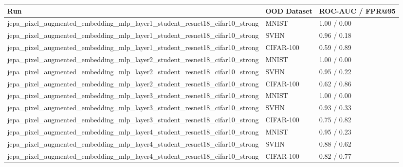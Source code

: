 \begin{tabular}{lll}
\toprule
Run & OOD Dataset & ROC-AUC / FPR@95 \\
\midrule
jepa\_pixel\_augmented\_embedding\_mlp\_layer1\_student\_resnet18\_cifar10\_strong & MNIST & 1.00 / 0.00 \\
jepa\_pixel\_augmented\_embedding\_mlp\_layer1\_student\_resnet18\_cifar10\_strong & SVHN & 0.96 / 0.18 \\
jepa\_pixel\_augmented\_embedding\_mlp\_layer1\_student\_resnet18\_cifar10\_strong & CIFAR-100 & 0.59 / 0.89 \\
jepa\_pixel\_augmented\_embedding\_mlp\_layer2\_student\_resnet18\_cifar10\_strong & MNIST & 1.00 / 0.00 \\
jepa\_pixel\_augmented\_embedding\_mlp\_layer2\_student\_resnet18\_cifar10\_strong & SVHN & 0.95 / 0.22 \\
jepa\_pixel\_augmented\_embedding\_mlp\_layer2\_student\_resnet18\_cifar10\_strong & CIFAR-100 & 0.62 / 0.86 \\
jepa\_pixel\_augmented\_embedding\_mlp\_layer3\_student\_resnet18\_cifar10\_strong & MNIST & 1.00 / 0.00 \\
jepa\_pixel\_augmented\_embedding\_mlp\_layer3\_student\_resnet18\_cifar10\_strong & SVHN & 0.93 / 0.33 \\
jepa\_pixel\_augmented\_embedding\_mlp\_layer3\_student\_resnet18\_cifar10\_strong & CIFAR-100 & 0.75 / 0.82 \\
jepa\_pixel\_augmented\_embedding\_mlp\_layer4\_student\_resnet18\_cifar10\_strong & MNIST & 0.95 / 0.23 \\
jepa\_pixel\_augmented\_embedding\_mlp\_layer4\_student\_resnet18\_cifar10\_strong & SVHN & 0.88 / 0.62 \\
jepa\_pixel\_augmented\_embedding\_mlp\_layer4\_student\_resnet18\_cifar10\_strong & CIFAR-100 & 0.82 / 0.77 \\
\bottomrule
\end{tabular}
